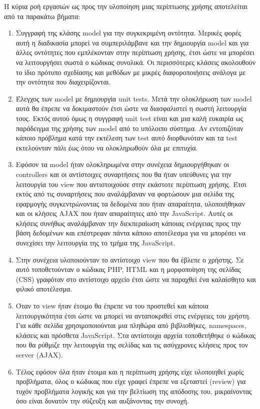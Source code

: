 Η κύρια ροή εργασιών ως προς την υλοποίηση μιας περίπτωσης χρήσης αποτελείται από τα παρακάτω βήματα:
\begin{enumerate}
\item Συγγραφή της κλάσης model για την συγκεκριμένη οντότητα. Μερικές φορές αυτή η διαδικασία μπορεί να συμπεριλάμβανε και την δημιουργία model και για άλλες οντότητες που εμπλέκονταν στην περίπτωση χρήσης, έτσι ώστε να μπορέσει να λειτουργήσει σωστά ο κώδικας συνολικά. Οι περισσότερες κλάσεις ακολουθούν το ίδιο πρότυπο σχεδίασης και μεθόδων με μικρές διαφοροποιήσεις ανάλογα με την οντότητα που διαχειρίζονται. 
\item Έλεγχος των model με δημιουργία unit tests. Μετά την ολοκλήρωση των model αυτά θα έπρεπε να δοκιμαστούν έτσι ώστε να διασφαλιστεί η σωστή λειτουργία τους. Εκτός αυτού όμως η συγγραφή unit test είναι και μια καλή ευκαιρία ως παράδειγμα της χρήσης των model από το υπόλοιπο σύστημα. Αν εντοπιζόταν κάποιο πρόβλημα κατά την εκτέλεση των test αυτό διορθωνόταν και τα test εκτελούνταν πάλι έως ότου να ολοκληρωθούν όλα με επιτυχία.
\item Εφόσον τα model ήταν ολοκληρωμένα στην συνέχεια δημιουργήθηκαν οι controllers και οι αντίστοιχες συναρτήσεις που θα ήταν υπεύθυνες για την λειτουργία του view που αντιστοιχούσε στην εκάστοτε περίπτωση χρήσης. Έτσι εκτός από τις συναρτήσεις που αναλάμβαναν να φορτώσουν μια σελίδα της εφαρμογής συγκεντρώνοντας τα δεδομένα που ήταν απαραίτητα, υλοποιήθηκαν και οι κλήσεις AJAX που ήταν απαραίτητες από την JavaScript. Αυτές οι κλήσεις συνήθως αναλάμβαναν την διεκπεραίωση κάποιας ενέργειας προς την βάση δεδομένων και επέστρεφαν πάντα κάποιο αποτέλεσμα για να μπορέσει να συνεχίσει την λειτουργία της το τμήμα της JavaScript.
\item Στην συνέχεια υλοποιούνταν το αντίστοιχο view που θα έβλεπε ο χρήστης. Σε αυτό τοποθετούνταν ο κώδικας PHP, HTML και η μορφοποίηση της σελίδας (CSS) γραφόταν στο αντίστοιχο αρχείο έτσι ώστε να παραχθεί ένα καλαίσθητο και φιλικό αποτέλεσμα.
\item Όταν το view ήταν έτοιμο θα έπρεπε να του προστεθεί και κάποια λειτουργικότητα έτσι ώστε να μπορεί να ανταποκριθεί στις ενέργειες του χρήστη. Για κάθε σελίδα χρησιμοποιούνται μια πληθώρα από βιβλιοθήκες, namespaces, κλάσεις και πρόσθετα JavaScript. Στα αντίστοιχα αρχεία τοποθετήθηκε ο κώδικας που θα ρύθμιζε την λειτουργία της σελίδας και τις ασύγχρονες κλήσεις προς τον server (AJAX). 
\item Τέλος εφόσον όλα ήταν έτοιμα και η περίπτωση χρήσης είχε υλοποιηθεί χωρίς προβλήματα, όλος ο κώδικας που είχε γραφεί έπρεπε να εξεταστεί (review) για τυχόν προβλήματα λογικής και για την βελτίωση της απόδοσης του, μικραίνοντας όσο είναι δυνατόν την σύζευξη και αυξάνοντας την συνοχή.
\end{enumerate}

